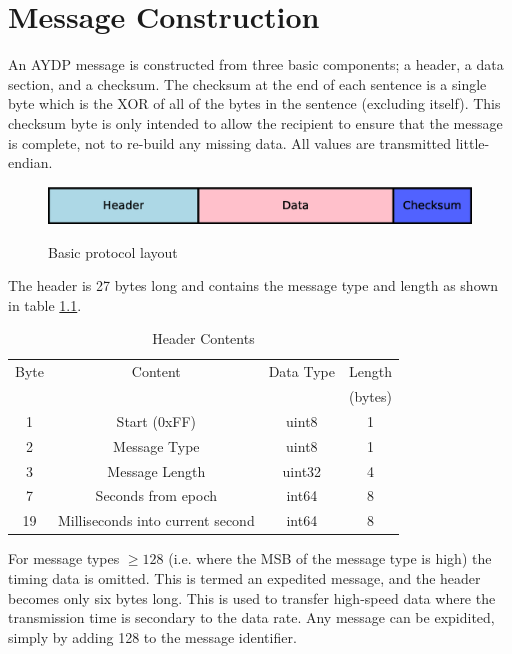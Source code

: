 \chapter{Message Construction}
An AYDP message is constructed from three basic components; a header, a data section, and a checksum. The checksum at the end of each sentence is a single byte which is the XOR of all of the bytes in the sentence (excluding itself). This checksum byte is only intended to allow the recipient to ensure that the message is complete, not to re-build any missing data. All values are transmitted little-endian.

\begin{figure}[H]
  \centering
  \includegraphics[width=1.0\textwidth]{Figures/protocolBasicLayout.eps}
  \label{figure:msg:basicProto}
  \caption{Basic protocol layout}
\end{figure}

The header is 27 bytes long and contains the message type and length as shown in table \ref{table:msg:header}.

\begin{table}[H]
  \centering
  \begin{tabular}{ c c c c }
  Byte &          Content    & Data Type & Length  \\
       &                     &           & (bytes) \\
\hline
   1   &  Start (0xFF)       &   uint8   &    1    \\
   2   &  Message Type       &   uint8   &    1    \\
   3   &  Message Length     &   uint32  &    4    \\
   7   &  Seconds from epoch &   int64   &    8    \\
   19  &  Milliseconds into current second & int64 & 8 \\
  \end{tabular}
  \caption{Header Contents}
  \label{table:msg:header}
\end{table}

For message types $\geq 128$ (i.e. where the MSB of the message type is high) the timing data is omitted. This is termed an expedited message, and the header becomes only six bytes long. This is used to transfer high-speed data where the transmission time is secondary to the data rate. Any message can be expidited, simply by adding 128 to the message identifier.


